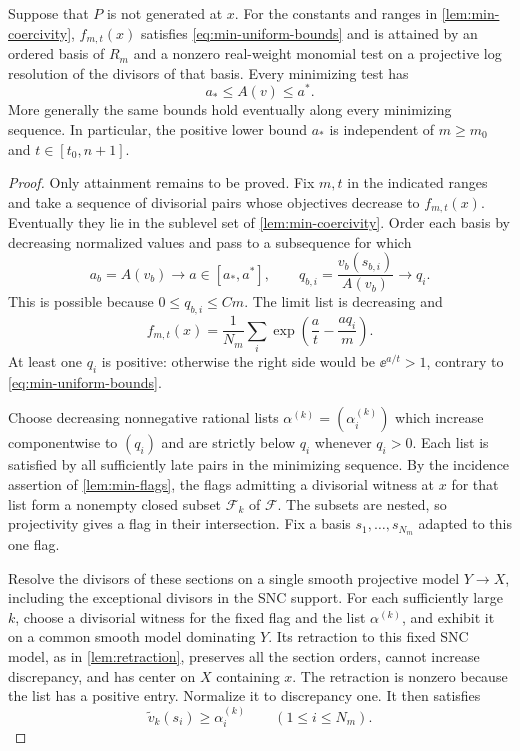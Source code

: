 \begin{proposition}
\label{prop:minimizers}
Suppose that $P$ is not generated at $x$. For the constants and ranges in \cref{lem:min-coercivity}, $f_{m,t}(x)$ satisfies \eqref{eq:min-uniform-bounds} and is attained by an ordered basis of $R_m$ and a nonzero real-weight monomial test on a projective log resolution of the divisors of that basis. Every minimizing test has
\[
 a_*\leq{A}(v)\leq a^*.
\]
More generally the same bounds hold eventually along every minimizing sequence. In particular, the positive lower bound $a_*$ is independent of $m\geq m_0$ and $t\in[t_0,n+1]$.
\end{proposition}

\begin{proof}
Only attainment remains to be proved. Fix $m,t$ in the indicated ranges and take a sequence of divisorial pairs whose objectives decrease to $f_{m,t}(x)$. Eventually they lie in the sublevel set of \cref{lem:min-coercivity}. Order each basis by decreasing normalized values and pass to a subsequence for which
\[
 a_b={A}(v_b)\longrightarrow a\in[a_*,a^*],\qquad
 q_{b,i}=\frac{v_b(s_{b,i})}{{A}(v_b)}\longrightarrow q_i.
\]
This is possible because $0\leq q_{b,i}\leq Cm$. The limit list is decreasing and
\begin{equation}
\label{eq:min-limit-objective}
 f_{m,t}(x)=\frac1{N_m}\sum_i
       \exp\!\left(\frac at-\frac{aq_i}m\right).
\end{equation}
At least one $q_i$ is positive: otherwise the right side would be $\ee^{a/t}>1$, contrary to \eqref{eq:min-uniform-bounds}.

Choose decreasing nonnegative rational lists $\alpha^{(k)}=(\alpha_i^{(k)})$ which increase componentwise to $(q_i)$ and are strictly below $q_i$ whenever $q_i>0$. Each list is satisfied by all sufficiently late pairs in the minimizing sequence. By the incidence assertion of \cref{lem:min-flags}, the flags admitting a divisorial witness at $x$ for that list form a nonempty closed subset $\mathcal{F}_k$ of $\mathcal{F}$. The subsets are nested, so projectivity gives a flag in their intersection. Fix a basis $s_1,\ldots,s_{N_m}$ adapted to this one flag.

Resolve the divisors of these sections on a single smooth projective model $Y\longrightarrow X$, including the exceptional divisors in the SNC support. For each sufficiently large $k$, choose a divisorial witness for the fixed flag and the list $\alpha^{(k)}$, and exhibit it on a common smooth model dominating $Y$. Its retraction to this fixed SNC model, as in \cref{lem:retraction}, preserves all the section orders, cannot increase discrepancy, and has center on $X$ containing $x$. The retraction is nonzero because the list has a positive entry. Normalize it to discrepancy one. It then satisfies
\begin{equation}
\label{eq:min-retracted-lists}
 \widetilde v_k(s_i)\geq\alpha_i^{(k)}
       \qquad(1\leq i\leq N_m).
\end{equation}


\end{proof}

